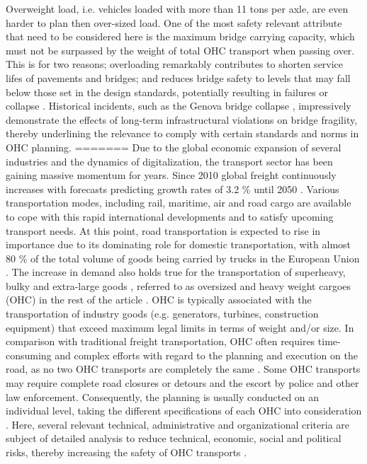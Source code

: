 Overweight load, i.e. vehicles loaded with more than 11 tons per axle, are even harder to plan then over-sized load.
One of the most safety relevant attribute that need to be considered here is the maximum bridge carrying capacity, which must not be surpassed by the weight of total OHC transport when passing over.
This is for two reasons; overloading remarkably contributes to shorten service lifes of pavements and bridges; and reduces bridge safety to levels that may fall below those set in the design standards, potentially resulting in failures or collapse \cite{fiorillo2018fragility}.
Historical incidents, such as the Genova bridge collapse \cite{Morgese.2020, MorandiNYTimes}, impressively demonstrate the effects of long-term infrastructural violations on bridge fragility, thereby underlining the relevance to comply with certain standards and norms in OHC planning.
=======
Due to the global economic expansion of several industries and the dynamics of digitalization, the transport sector has been gaining massive momentum for years.
Since 2010 global freight continuously increases with forecasts predicting growth rates of 3.2 \% until 2050 \cite{figura2020preferences, InternationalTransportForum}.
Various transportation modes, including rail, maritime, air and road cargo are available to cope with this rapid international developments and to satisfy upcoming transport needs.
At this point, road transportation is expected to rise in importance due to its dominating role for domestic transportation, with almost 80 \% of the total volume of goods being carried by trucks in the European Union \cite{Eurostat}.
The increase in demand also holds true for the transportation of superheavy, bulky and extra-large goods \cite{gavrilova2021analysis}, referred to as oversized and heavy weight cargoes (OHC) in the rest of the article \cite{Luo.2021}.
OHC is typically associated with the transportation of industry goods (e.g. generators, turbines, construction equipment) that exceed maximum legal limits in terms of weight and/or size.
In comparison with traditional freight transportation, OHC often requires time-consuming and complex efforts with regard to the planning and execution on the road, as no two OHC transports are completely the same \cite{Wolnowska.2019}.
Some OHC transports may require complete road closures or detours and the escort by police and other law enforcement.
Consequently, the planning is usually conducted on an individual level, taking the different specifications of each OHC into consideration \cite{Bazaras.2013}.
Here, several relevant technical, administrative and organizational criteria are subject of detailed analysis to reduce technical, economic, social and political risks, thereby increasing the safety of OHC transports \cite{Palsaitis.2012}.
